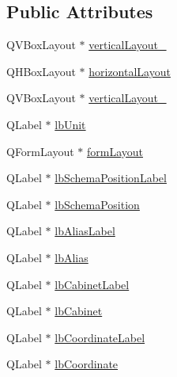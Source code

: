 \subsection*{Public Attributes}
\begin{DoxyCompactItemize}
\item 
Q\-V\-Box\-Layout $\ast$ \hyperlink{class_ui__mdt_cl_linked_unit_connection_info_dialog_a5d4655d9df3b47d707383addb263ad93}{vertical\-Layout\-\_}
\item 
Q\-H\-Box\-Layout $\ast$ \hyperlink{class_ui__mdt_cl_linked_unit_connection_info_dialog_a49318086b7dc4edead8eeaae323f06a1}{horizontal\-Layout}
\item 
Q\-V\-Box\-Layout $\ast$ \hyperlink{class_ui__mdt_cl_linked_unit_connection_info_dialog_aeb6bef8b76b292ac59be916105d712cf}{vertical\-Layout\-\_}
\item 
Q\-Label $\ast$ \hyperlink{class_ui__mdt_cl_linked_unit_connection_info_dialog_a8e6d068442250513739eef535668c7c3}{lb\-Unit}
\item 
Q\-Form\-Layout $\ast$ \hyperlink{class_ui__mdt_cl_linked_unit_connection_info_dialog_a2db825422e95efefba46919874b5cf1e}{form\-Layout}
\item 
Q\-Label $\ast$ \hyperlink{class_ui__mdt_cl_linked_unit_connection_info_dialog_aebfcbb0c37f6c6db5d581413a4f8e532}{lb\-Schema\-Position\-Label}
\item 
Q\-Label $\ast$ \hyperlink{class_ui__mdt_cl_linked_unit_connection_info_dialog_a8eacc9a070de8397d893beea7a2f41ee}{lb\-Schema\-Position}
\item 
Q\-Label $\ast$ \hyperlink{class_ui__mdt_cl_linked_unit_connection_info_dialog_a9fce06c7c6eae6eea9f0818415af2558}{lb\-Alias\-Label}
\item 
Q\-Label $\ast$ \hyperlink{class_ui__mdt_cl_linked_unit_connection_info_dialog_a6e011a3905403140c54a631a3f8907ef}{lb\-Alias}
\item 
Q\-Label $\ast$ \hyperlink{class_ui__mdt_cl_linked_unit_connection_info_dialog_a710c7b2070ce9cce2fcd99428674d012}{lb\-Cabinet\-Label}
\item 
Q\-Label $\ast$ \hyperlink{class_ui__mdt_cl_linked_unit_connection_info_dialog_a512b49e4632b934e43644d15e8ad218f}{lb\-Cabinet}
\item 
Q\-Label $\ast$ \hyperlink{class_ui__mdt_cl_linked_unit_connection_info_dialog_a6860855d2757d7134e4c5d7b6443fe4d}{lb\-Coordinate\-Label}
\item 
Q\-Label $\ast$ \hyperlink{class_ui__mdt_cl_linked_unit_connection_info_dialog_a9ed34330d2ea90c5142c3ccbb93e323b}{lb\-Coordinate}

\end{DoxyCompactItemize}
